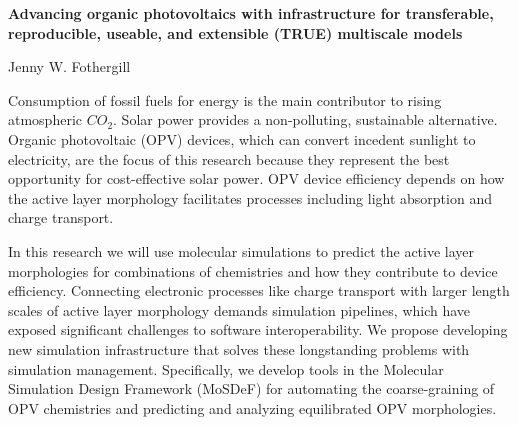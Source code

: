 \documentclass{article}
\begin{document}
\begin{center}
    \large{\textbf{Advancing organic photovoltaics with infrastructure for transferable, reproducible, useable, and extensible (TRUE) multiscale models}}
\end{center}
\begin{center}
    Jenny W. Fothergill
\end{center}

Consumption of fossil fuels for energy is the main contributor to rising atmospheric $CO_{2}$. 
Solar power provides a non-polluting, sustainable alternative.
Organic photovoltaic (OPV) devices, which can convert incedent sunlight to electricity, are the focus of this research because they represent the best opportunity for cost-effective solar power.
OPV device efficiency depends on how the active layer morphology facilitates processes including light absorption and charge transport.

In this research we will use molecular simulations to predict the active layer morphologies for combinations of chemistries and how they contribute to device efficiency.
Connecting electronic processes like charge transport with larger length scales of active layer morphology demands simulation pipelines, which have exposed significant challenges to software interoperability.
We propose developing new simulation infrastructure that solves these longstanding problems with simulation management.
Specifically, we develop tools in the Molecular Simulation Design Framework (MoSDeF) for automating the coarse-graining of OPV chemistries and predicting and analyzing equilibrated OPV morphologies.
\end{document}
